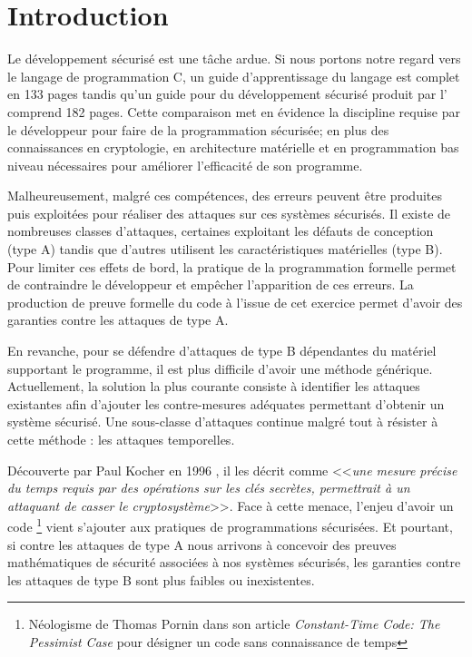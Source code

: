 \chapter*{Introduction}

Le développement sécurisé est une tâche ardue. Si nous portons notre regard vers le langage de programmation C, un guide \cite{progC_guide} d'apprentissage du langage est complet en 133 pages tandis qu'un guide pour du développement sécurisé\cite{anssi_guideForSecureprogramming} produit par l' comprend 182 pages. Cette comparaison met en évidence la discipline requise par le développeur pour faire de la programmation sécurisée; en plus des connaissances en cryptologie, en architecture matérielle et en programmation bas niveau nécessaires pour améliorer l'efficacité de son programme. \medbreak

Malheureusement, malgré ces compétences, des erreurs peuvent être produites puis exploitées pour réaliser des attaques sur ces systèmes sécurisés. Il existe de nombreuses classes d'attaques, certaines exploitant les défauts de conception (type A) tandis que d'autres utilisent les caractéristiques matérielles (type B). Pour limiter ces effets de bord, la pratique de la programmation formelle permet de contraindre le développeur et empêcher l'apparition de ces erreurs. La production de preuve formelle du code à l'issue de cet exercice permet d'avoir des garanties contre les attaques de type A.

En revanche, pour se défendre d'attaques de type B dépendantes du matériel supportant le programme, il est plus difficile d'avoir une méthode générique. Actuellement, la solution la plus courante consiste à identifier les attaques existantes afin d'ajouter les contre-mesures adéquates permettant d'obtenir un système sécurisé. Une sous-classe d'attaques continue malgré tout à résister à cette méthode : les attaques temporelles.\medbreak

Découverte par Paul Kocher en 1996 \cite{crypto-1996-1469}, il les décrit comme <<\textit{une mesure précise du temps requis par des opérations sur les clés secrètes, permettrait à un attaquant de casser le cryptosystème}>>. Face à cette menace, l'enjeu d'avoir un code \textit{}\footnote{Néologisme de Thomas Pornin dans son article \textit{Constant-Time Code: The Pessimist Case} \cite{constantTimePornin} pour désigner un code sans connaissance de temps} vient s'ajouter aux pratiques de programmations sécurisées. Et pourtant, si contre les attaques de type A nous arrivons à concevoir des preuves mathématiques de sécurité associées à nos systèmes sécurisés, les garanties contre les attaques de type B sont plus faibles ou inexistentes.\medbreak

